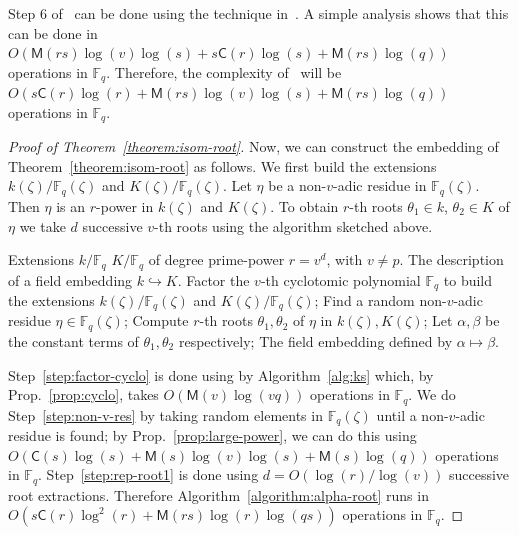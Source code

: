 \documentclass[12pt]{article}
\theoremstyle{plain}
\theoremstyle{definition}
\def\F{\ensuremath{\mathbb{F}}}
\def\MM{\ensuremath{\mathsf{M}}}
\def\CC{\ensuremath{\mathsf{C}}}
\newcounter{algorithm}
\begin{document}
Step 6 of~\cite[Algorithm~3]{doliskanischost2011} can be done using the technique
in~\cite[Lemma~14]{shoup94}. A simple analysis shows that this can be done in $O(\MM(rs)\log(v)\log(s) + 
s\CC(r)\log(s) + \MM(rs)\log(q))$ operations in $\F_q$. Therefore, the complexity
of~\cite[Algorithm~3]{doliskanischost2011} will be $O(s\CC(r)\log(r) + \MM(rs)\log(v)\log(s) + 
\MM(rs)\log(q))$ operations in $\F_q$.

\begin{proof}[Proof of Theorem~\ref{theorem:isom-root}]
Now, we can construct the embedding of Theorem~\ref{theorem:isom-root} as follows. We first build the 
extensions $k(\zeta) / \F_q(\zeta)$ and $K(\zeta)/\F_q(\zeta)$. Let $\eta$ be a non-$v$-adic residue in $\F_q(\zeta)$. 
Then $\eta$ is an $r$-power in $k(\zeta)$ and $K(\zeta)$. To obtain $r$-th roots $\theta_1\in k$, $\theta_2\in K$ of $\eta$ we take $d$ 
successive $v$-th roots using the algorithm sketched above. 

\begin{algorithm}
	\label{algorithm:alpha-root}
	\begin{algorithmic}[1]
		\REQUIRE Extensions $k / \F_q$ $K/\F_q$ of degree prime-power $r = v^d$, with $v\ne p$.
		\ENSURE The description of a field embedding $k\hookrightarrow K$.
		\STATE\label{step:factor-cyclo} Factor the $v$-th cyclotomic polynomial $\F_q$ to 
		build the extensions $k(\zeta) / \F_q(\zeta)$ and $K(\zeta)/\F_q(\zeta)$;
		\STATE\label{step:non-v-res} Find a random non-$v$-adic residue $\eta \in \F_q(\zeta)$;
		\STATE\label{step:rep-root1} Compute $r$-th roots $\theta_1,\theta_2$ of $\eta$ in $k(\zeta),K(\zeta)$;
		\STATE Let $\alpha, \beta$ be the constant terms of $\theta_1, \theta_2$ respectively;
		\RETURN The field embedding defined by $\alpha\mapsto\beta$.
	\end{algorithmic}
\end{algorithm}

Step~\ref{step:factor-cyclo} is done using by Algorithm~\ref{alg:ks} which, by Prop.~\ref{prop:cyclo}, takes $O(\MM(v)\log(vq))$ operations in $\F_q$. We do Step~\ref{step:non-v-res} by taking random elements in $\F_q(\zeta)$ until a non-$v$-adic residue is found; by Prop.~\ref{prop:large-power},
we can do this using $O(\CC(s)\log(s) + \MM(s)\log(v)\log(s) + \MM(s)\log(q))$ operations in 
$\F_q$. Step~\ref{step:rep-root1} is done using $d = O(\log(r) / \log(v))$ successive root 
extractions. Therefore Algorithm~\ref{algorithm:alpha-root} runs in $O(s\CC(r)\log^2(r) + 
\MM(rs)\log(r)\log(qs))$ operations in $\F_q$.
\end{proof}
\end{document}
